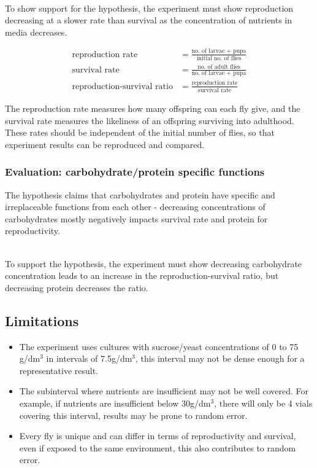 \documentclass{article}
\begin{document}
\noindent\\
To show support for the hypothesis, the experiment must show reproduction decreasing at a slower rate than survival as the concentration of nutrients in media decreases.

\begin{align*}
  \text{reproduction rate}&=\frac{\text{no. of larvae + pupa}}{\text{initial no. of flies}}\\
  \text{survival rate}&=\frac{\text{no. of adult flies}}{\text{no. of larvae + pupa}}\\
  \text{reproduction-survival ratio}&=\frac{\text{reproduction rate}}{\text{survival rate}}
\end{align*}

\noindent
The reproduction rate measures how many offspring can each fly give, and the survival rate measures the likeliness of an offspring surviving into adulthood. These rates should be independent of the initial number of flies, so that experiment results can be reproduced and compared.

\subsubsection{Evaluation: carbohydrate/protein specific functions}

The hypothesis claims that carbohydrates and protein have specific and irreplaceable functions from each other - decreasing concentrations of carbohydrates mostly negatively impacts survival rate and protein for reproductivity.

\noindent\\
To support the hypothesis, the experiment must show decreasing carbohydrate concentration leads to an increase in the reproduction-survival ratio, but decreasing protein decreases the ratio.

\subsection{Limitations}

\begin{itemize}
    \item The experiment uses cultures with sucrose/yeast concentrations of 0 to 75 g/dm$^3$ in intervals of 7.5g/dm$^3$, this interval may not be dense enough for a representative result.
    \item The subinterval where nutrients are insufficient may not be well covered. For example, if nutrients are insufficient below 30g/dm$^3$, there will only be 4 vials covering this interval, results may be prone to random error.
    \item Every fly is unique and can differ in terms of reproductivity and survival, even if exposed to the same environment, this also contributes to random error.
\end{itemize}
\end{document}
